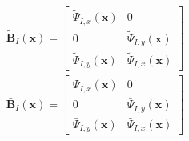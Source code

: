 \begin{equation}
\begin{split}
    \tilde{\pmb{B}}_I(\pmb{x})= \left[\begin{matrix}\tilde{\Psi}_{I,x}(\pmb{x})&0\\0&\tilde{\Psi}_{I,y}(\pmb{x})\\\tilde{\Psi}_{I,y}(\pmb{x})&\tilde{\Psi}_{I,x}(\pmb{x}) \end{matrix}\right] 
\end{split}
\end{equation}
\begin{equation}
\begin{split}
    \bar{\pmb{B}}_I(\pmb{x})= \left[\begin{matrix}\bar{\Psi}_{I,x}(\pmb{x})&0\\0&\bar{\Psi}_{I,y}(\pmb{x})\\\bar{\Psi}_{I,y}(\pmb{x})&\bar{\Psi}_{I,x}(\pmb{x}) \end{matrix}\right] 
\end{split}
\end{equation}
